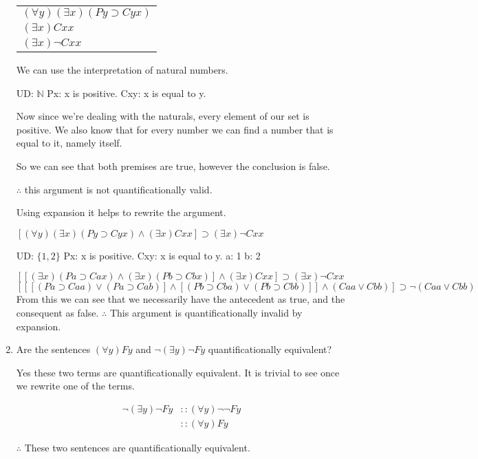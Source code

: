 \documentclass[12pt,letterpaper]{article}
\begin{document}
\begin{enumerate}
      \begin{tabular}{l}
        $(\forall y)(\exists x)(Py \supset Cyx)$ \\
        $(\exists x)Cxx$ \\
        \hline
        $(\exists x)\neg Cxx$
      \end{tabular}

      We can use the interpretation of natural numbers.

      UD: $\mathbb{N}$
      Px: x is positive.
      Cxy: x is equal to y.

      Now since we're dealing with the naturals, every element of our set is positive.
      We also know that for every number we can find a number that is equal to it, namely itself.

      So we can see that both premises are true, however the conclusion is false.

      $\therefore$ this argument is not quantificationally valid.

      Using expansion it helps to rewrite the argument.

      $[(\forall y)(\exists x)(Py \supset Cyx) \land (\exists x)Cxx] \supset (\exists x)\neg Cxx$

      UD: $\{ 1, 2 \}$
      Px: x is positive.
      Cxy: x is equal to y.
      a: 1
      b: 2

      $[[(\exists x)(Pa \supset Cax) \land (\exists x)(Pb \supset Cbx)] \land (\exists x)Cxx] \supset (\exists x)\neg Cxx$ \\
      $[[[(Pa \supset Caa) \lor (Pa \supset Cab)] \land [(Pb \supset Cba) \lor (Pb \supset Cbb)]] \land (Caa \lor Cbb)] \supset \neg (Caa \lor Cbb)$ \\
      From this we can see that we necessarily have the antecedent as true, and the consequent as false.
      $\therefore$ This argument is quantificationally invalid by expansion.
    \item
      Are the sentences $(\forall y)Fy$ and $\neg (\exists y) \neg Fy$
      quantificationally equivalent?

      Yes these two terms are quantificationally equivalent.
      It is trivial to see once we rewrite one of the terms.

      \begin{align*}
        \neg (\exists y) \neg Fy &:: (\forall y) \neg \neg Fy \\
        &:: (\forall y) Fy
      \end{align*}

      $\therefore$ These two sentences are quantificationally equivalent.
  \end{enumerate}
\end{document}
